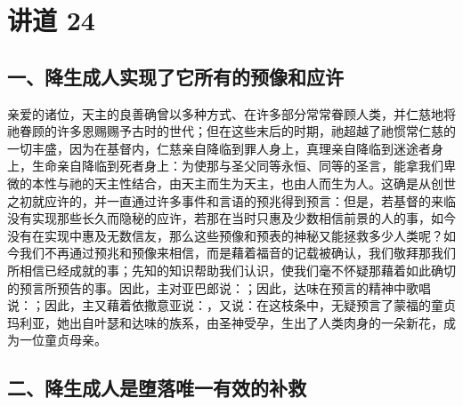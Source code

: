 

\section{讲道 24}

\par


\subsection{一、降生成人实现了它所有的预像和应许}

亲爱的诸位，天主的良善确曾以多种方式、在许多部分常常眷顾人类，并仁慈地将祂眷顾的许多恩赐赐予古时的世代；但在这些末后的时期，祂超越了祂惯常仁慈的一切丰盛，因为在基督内，仁慈亲自降临到罪人身上，真理亲自降临到迷途者身上，生命亲自降临到死者身上：为使那与圣父同等永恒、同等的圣言，能拿我们卑微的本性与祂的天主性结合，由天主而生为天主，也由人而生为人。这确是从创世之初就应许的，并一直通过许多事件和言语的预兆得到预言：但是，若基督的来临没有实现那些长久而隐秘的应许，若那在当时只惠及少数相信前景的人的事，如今没有在实现中惠及无数信友，那么这些预像和预表的神秘又能拯救多少人类呢？如今我们不再通过预兆和预像来相信，而是藉着福音的记载被确认，我们敬拜那我们所相信已经成就的事；先知的知识帮助我们认识，使我们毫不怀疑那藉着如此确切的预言所预告的事。因此，主对亚巴郎说：；因此，达味在预言的精神中歌唱说：；因此，主又藉着依撒意亚说：，又说：在这枝条中，无疑预言了蒙福的童贞玛利亚，她出自叶瑟和达味的族系，由圣神受孕，生出了人类肉身的一朵新花，成为一位童贞母亲。\par


\subsection{二、降生成人是堕落唯一有效的补救}

